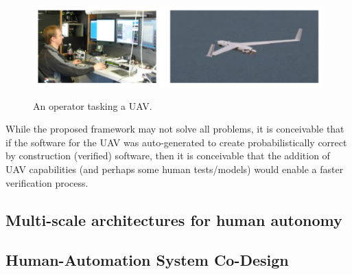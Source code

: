 \begin{figure}[h] %
   \centering
   \includegraphics[height=1.5in]{uav-operator.pdf} 
   \caption{An operator tasking a UAV. }
   \label{fig:uav-operator}
\end{figure}


While the proposed framework may not solve all problems, it is conceivable that if the software for the UAV was auto-generated to create probabilistically correct by construction (verified) software, then it is conceivable that the addition of UAV capabilities (and perhaps some human tests/models) would enable a faster verification process. 



\subsection*{Multi-scale architectures for human autonomy}


\subsection*{Human-Automation System Co-Design}


